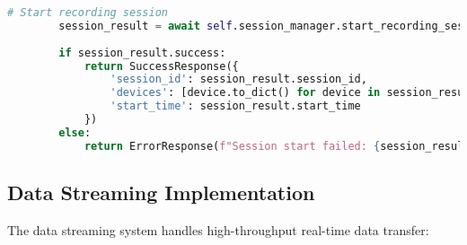 \documentclass[11pt,a4paper]{report}
\begin{document}
\begin{lstlisting}[language=Python]
        # Start recording session
        session_result = await self.session_manager.start_recording_session(session_config)
        
        if session_result.success:
            return SuccessResponse({
                'session_id': session_result.session_id,
                'devices': [device.to_dict() for device in session_result.devices],
                'start_time': session_result.start_time
            })
        else:
            return ErrorResponse(f"Session start failed: {session_result.error}")
\end{lstlisting}

\subsection{Data Streaming Implementation}

The data streaming system handles high-throughput real-time data transfer:
\end{document}

